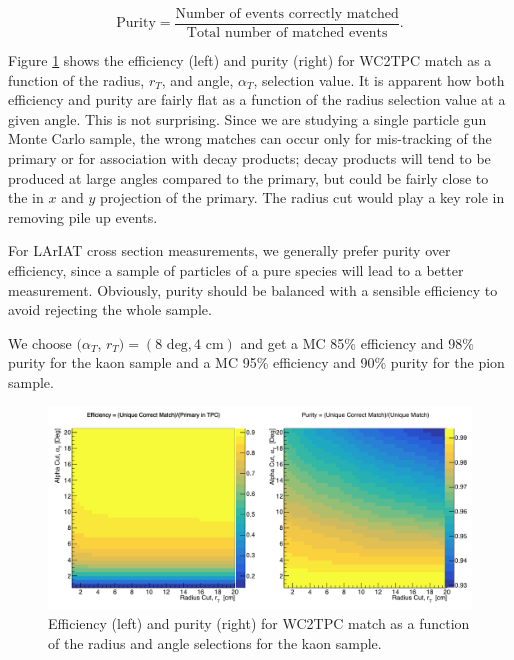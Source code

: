 \begin{equation}
\text{Purity} = \frac{\text{Number of events correctly matched}}{\text{Total number of matched events}}.
\end{equation}

Figure \ref{fig:EffPurityK} shows the efficiency (left) and purity (right) for WC2TPC match as a function of the radius, $r_{T}$, and angle, $\alpha_{T}$, selection value. It is apparent how both efficiency and purity are fairly flat as a function of the radius selection value at a given angle. This is not surprising. Since we are studying a single particle gun Monte Carlo sample, the wrong matches can occur only for mis-tracking of the primary or for association with decay products;  decay products will tend to be produced at large angles compared to the primary, but could be fairly close to the in $x$ and $y$ projection of the primary. The radius cut would play a key role in removing pile up events. 

For LArIAT cross section measurements, we generally prefer purity over efficiency, since a sample of particles of a pure species will lead to a better measurement. Obviously, purity should be balanced with a sensible efficiency to avoid rejecting the whole sample. 

We choose $(\alpha_{T}$, $r_{T}) = (8 \text{ deg}, 4 \text{ cm} )$ and get a MC 85\% efficiency and 98\% purity for the kaon sample and a MC 95\% efficiency and 90\% purity for the pion sample.


\begin{figure}[hpbt]
\centering
\includegraphics[width=15cm]{Chapter-5/Images/KEffPurity.png}
\caption{Efficiency (left) and purity (right) for WC2TPC match as a function of the radius and angle selections for the kaon sample.}
\label{fig:EffPurityK}
\end{figure}




